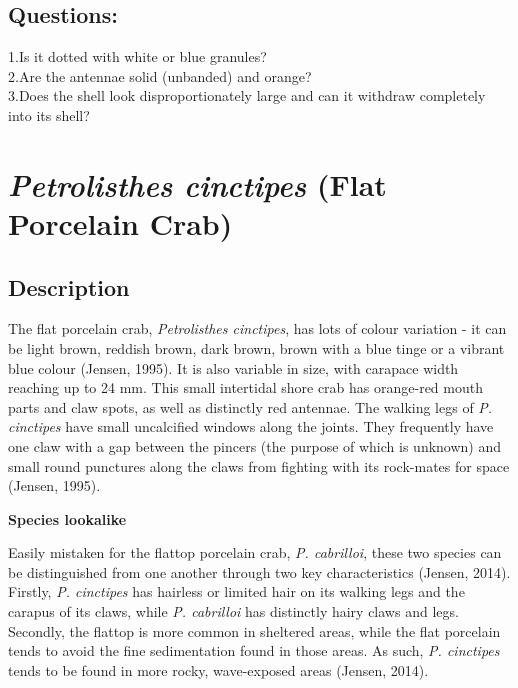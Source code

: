\documentclass[
]{article}
\begin{document}
\hypertarget{questions-1}{%
\subsection{Questions:}\label{questions-1}}

1.Is it dotted with white or blue granules?\\
2.Are the antennae solid (unbanded) and orange?\\
3.Does the shell look disproportionately large and can it withdraw
completely into its shell?

\newpage

\hypertarget{petrolisthes-cinctipes-flat-porcelain-crab}{%
\section{\texorpdfstring{\emph{Petrolisthes cinctipes} (Flat Porcelain
Crab)}{Petrolisthes cinctipes (Flat Porcelain Crab)}}\label{petrolisthes-cinctipes-flat-porcelain-crab}}

\hypertarget{description-2}{%
\subsection{Description}\label{description-2}}

The flat porcelain crab, \emph{Petrolisthes cinctipes}, has lots of
colour variation - it can be light brown, reddish brown, dark brown,
brown with a blue tinge or a vibrant blue colour (Jensen, 1995). It is
also variable in size, with carapace width reaching up to 24 mm. This
small intertidal shore crab has orange-red mouth parts and claw spots,
as well as distinctly red antennae. The walking legs of \emph{P.
cinctipes} have small uncalcified windows along the joints. They
frequently have one claw with a gap between the pincers (the purpose of
which is unknown) and small round punctures along the claws from
fighting with its rock-mates for space (Jensen, 1995).

\textbf{Species lookalike}

Easily mistaken for the flattop porcelain crab, \emph{P. cabrilloi},
these two species can be distinguished from one another through two key
characteristics (Jensen, 2014). Firstly, \emph{P. cinctipes} has
hairless or limited hair on its walking legs and the carapus of its
claws, while \emph{P. cabrilloi} has distinctly hairy claws and legs.
Secondly, the flattop is more common in sheltered areas, while the flat
porcelain tends to avoid the fine sedimentation found in those areas. As
such, \emph{P. cinctipes} tends to be found in more rocky, wave-exposed
areas (Jensen, 2014).
\end{document}
